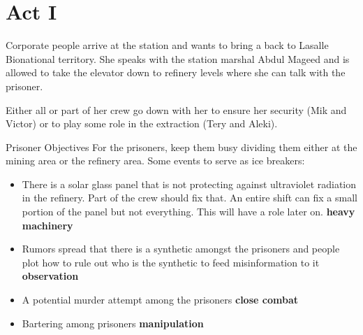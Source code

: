 \chapter{Act I}



\begin{rpg-commentbox}{}

    Corporate people arrive at the station and  wants to bring a  back to Lasalle Bionational territory. She speaks with the station marshal Abdul Mageed and is allowed to take the elevator down to refinery levels where she can talk with the prisoner.

    Either all or part of her crew go down with her to ensure her security (Mik and Victor) or to play some role in the extraction (Tery and Aleki). 
    
\end{rpg-commentbox}







\medskip
\begin{rpg-commentbox}{Prisoner Objectives}
For the prisoners, keep them busy dividing them either at the mining area or the refinery area. Some events to serve as ice breakers:

\begin{itemize}
    \item There is a solar glass panel that is not protecting against ultraviolet radiation in the refinery. Part of the crew should fix that. An entire shift can fix a small portion of the panel but not everything. This will have a role later on. \textbf{heavy machinery}

    \item Rumors spread that there is a synthetic amongst the prisoners and people plot how to rule out who is the synthetic to feed misinformation to it \textbf{observation}

    \item A potential murder attempt among the prisoners \textbf{close combat}

    \item Bartering among prisoners \textbf{manipulation}
\end{itemize}
\end{rpg-commentbox}



